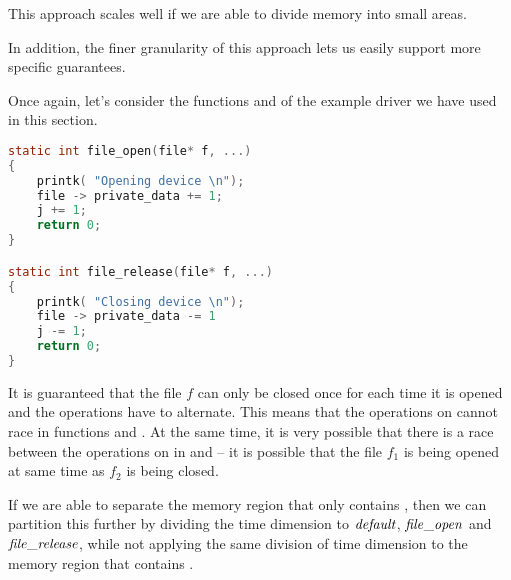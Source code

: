 \documentclass[..thesis.tex]{subfiles}
\begin{document}
This approach scales well if we are able to divide memory into small areas.



In addition, the finer granularity of this approach lets us easily support more specific guarantees.

Once again, let's consider the functions  and  of the example driver we have used in this section.

\begin{lstlisting}[language=c,style=def]
static int file_open(file* f, ...)
{
    printk( "Opening device \n");
    file -> private_data += 1;
    j += 1;
    return 0;
}

static int file_release(file* f, ...)
{
    printk( "Closing device \n");
    file -> private_data -= 1
    j -= 1;
    return 0;
}
\end{lstlisting}

It is guaranteed that the file $f$ can only be closed once for each time it is opened and the operations have to alternate. This means that the operations on 
cannot race in functions  and . At the same time, it is very possible that there is a race between the operations on  in  and 
-- it is possible that the file $f_1$ is being opened at same time as $f_2$ is being closed. 

If we are able to separate the memory region that only contains , then we can partition this further by dividing the time dimension to $\mathit{default}$, $\mathit{file\_open}$ and $\mathit{file\_release}$,
while not applying the same division of time dimension to the memory region that contains . 
\end{document}
